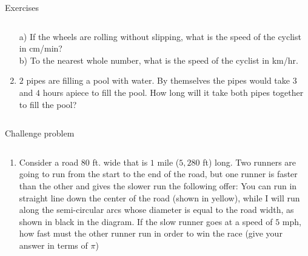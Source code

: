 \documentclass[9pt,aspectratio=169]{beamer}
\begin{document}
\begin{frame}{Exercises}
\begin{columns}[T]
\begin{column}{0.5\textwidth}
\begin{enumerate}
        a) If the wheels are rolling without slipping, what is the speed of the cyclist in cm/min?\\
        b) To the nearest whole number, what is the speed of the cyclist in km/hr.
        \item $2$ pipes are filling a pool with water.  By themselves the pipes would take $3$ and $4$ hours apiece to fill the pool.  How long will it take both pipes together to fill the pool?
      \end{enumerate}
    \end{column}
  \end{columns}
\end{frame}

\begin{frame}{Challenge problem}
  \begin{columns}[T]
    \begin{column}{0.5\textwidth}
      \begin{enumerate}
        \item Consider a road $80$ ft. wide that is $1$ mile ($5{,}280$ ft) long.  Two runners are going to run from the start to the end of the road, but one runner is faster than the other and gives the slower run the following offer:  You can run in straight line down the center of the road (shown in yellow), while I will run along the semi-circular arcs whose diameter is equal to the road width, as shown in black in the diagram.  If the slow runner goes at a speed of $5$ mph, how fast must the other runner run in order to win the race (give your answer in terms of $\pi$)
        

\end{enumerate}
\end{column}
\end{columns}
\end{frame}
\end{document}
